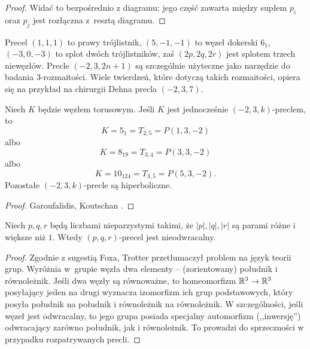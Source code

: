 \begin{proof}
    Widać to bezpośrednio z diagramu: jego część zawarta między supłem $p_i$ oraz $p_j$ jest rozłączna z~resztą diagramu.
\end{proof}

Precel $(1,1,1)$ to prawy trójlistnik, $(5, -1, -1)$ to węzeł dokerski $6_1$, $(-3, 0, -3)$ to splot dwóch trójlistników, zaś $(2p, 2q, 2r)$ jest splotem trzech niewęzłów.
Precle $(-2, 3, 2n+1)$ są szczególnie użyteczne jako narzędzie do badania 3-rozmaitości.
Wiele twierdzeń, które dotyczą takich rozmaitości, opiera się na przykład na chirurgii Dehna precla $(-2, 3, 7)$.
%
%

\begin{proposition}
%
    Niech $K$ będzie węzłem torusowym.
    Jeśli $K$ jest jednocześnie $(-2, 3, k)$-preclem, to
    \begin{equation}
        K = 5_{1} = T_{2,5} = P(1, 3, -2)
    \end{equation}
    albo
    \begin{equation}
        K = 8_{19} = T_{3,4} = P(3, 3, -2)
    \end{equation}
    albo
    \begin{equation}
        K = 10_{124} = T_{3,5} = P(5, 3, -2).
    \end{equation}
    Pozostałe $(-2, 3, k)$-precle są hiperboliczne.
\end{proposition}

\begin{proof}
%
%
    Garoufalidis, Koutschan \cite{garoufalidis2012}.
\end{proof}

\begin{proposition}
\label{prp:pretzel_not_invertible}%
    Niech $p, q, r$ będą liczbami nieparzystymi takimi, że $|p|, |q|, |r|$ są parami różne i większe niż $1$.
    Wtedy $(p, q, r)$-precel jest nieodwracalny.
\end{proposition}

\begin{proof}
%
%
    Zgodnie z sugestią Foxa, Trotter \cite{trotter1963} przetłumaczył problem na język teorii grup.
    Wyróżnia w~grupie węzła dwa elementy -- (zorientowany) południk i równoleżnik.
    Jeśli dwa węzły są równoważne, to homeomorfizm $\mathbb R^3 \to \mathbb R^3$ posyłający jeden na drugi wyznacza izomorfizm ich grup podstawowych, który posyła południk na południk i równoleżnik na równoleżnik.
    W szczególności, jeśli węzeł jest odwracalny, to jego grupa posiada specjalny automorfizm (,,inwersję'') odwracający zarówno południk, jak i równoleżnik.
    To prowadzi do sprzeczności w przypadku rozpatrywanych precli.
\end{proof}

